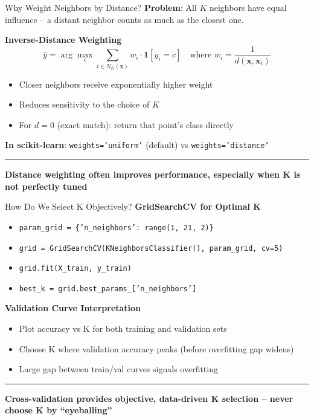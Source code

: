 \documentclass[8pt,aspectratio=169]{beamer}
\newcommand{\bottomnote}[1]{%
\vfill
\vspace{-2mm}
\textcolor{mllavender2}{\rule{\textwidth}{0.4pt}}
\vspace{1mm}
\footnotesize
\textbf{#1}
}
\begin{document}
\begin{frame}[t]{Why Weight Neighbors by Distance?}
\textbf{Problem}: All $K$ neighbors have equal influence -- a distant neighbor counts as much as the closest one.
\vspace{0.5em}

\textbf{Inverse-Distance Weighting}
$$\hat{y} = \arg\max_c \sum_{i \in N_K(\mathbf{x})} w_i \cdot \mathbf{1}[y_i = c] \quad \text{where } w_i = \frac{1}{d(\mathbf{x}, \mathbf{x}_i)}$$
\begin{itemize}
\item Closer neighbors receive exponentially higher weight
\item Reduces sensitivity to the choice of $K$
\item For $d=0$ (exact match): return that point's class directly
\end{itemize}
\vspace{0.3em}
\textbf{In scikit-learn}: \texttt{weights='uniform'} (default) vs \texttt{weights='distance'}
\bottomnote{Distance weighting often improves performance, especially when K is not perfectly tuned}
\end{frame}

\begin{frame}[t]{How Do We Select K Objectively?}
\textbf{GridSearchCV for Optimal K}
\begin{itemize}
\item \texttt{param\_grid = \{'n\_neighbors': range(1, 21, 2)\}}
\item \texttt{grid = GridSearchCV(KNeighborsClassifier(), param\_grid, cv=5)}
\item \texttt{grid.fit(X\_train, y\_train)}
\item \texttt{best\_k = grid.best\_params\_['n\_neighbors']}
\end{itemize}
\vspace{0.5em}
\textbf{Validation Curve Interpretation}
\begin{itemize}
\item Plot accuracy vs K for both training and validation sets
\item Choose K where validation accuracy peaks (before overfitting gap widens)
\item Large gap between train/val curves signals overfitting
\end{itemize}
\bottomnote{Cross-validation provides objective, data-driven K selection -- never choose K by ``eyeballing''}
\end{frame}
\end{document}

